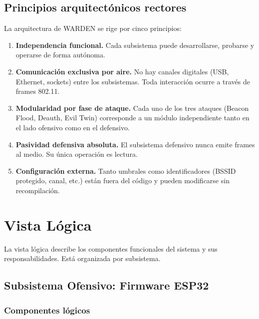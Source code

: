 \documentclass[11pt,a4paper]{article}
\begin{document}
\subsection{Principios arquitectónicos rectores}
La arquitectura de WARDEN se rige por cinco principios:

\begin{enumerate}
  \item \textbf{Independencia funcional.} Cada subsistema puede
    desarrollarse, probarse y operarse de forma autónoma.
  \item \textbf{Comunicación exclusiva por aire.} No hay canales
    digitales (USB, Ethernet, sockets) entre los subsistemas. Toda
    interacción ocurre a través de frames 802.11.
  \item \textbf{Modularidad por fase de ataque.} Cada uno de los tres
    ataques (Beacon Flood, Deauth, Evil Twin) corresponde a un módulo
    independiente tanto en el lado ofensivo como en el defensivo.
  \item \textbf{Pasividad defensiva absoluta.} El subsistema defensivo
    nunca emite frames al medio. Su única operación es lectura.
  \item \textbf{Configuración externa.} Tanto umbrales como
    identificadores (BSSID protegido, canal, etc.) están fuera del
    código y pueden modificarse sin recompilación.
\end{enumerate}

\section{Vista Lógica}

La vista lógica describe los componentes funcionales del sistema y sus
responsabilidades. Está organizada por subsistema.

\subsection{Subsistema Ofensivo: Firmware ESP32}

\subsubsection{Componentes lógicos}
\end{document}
